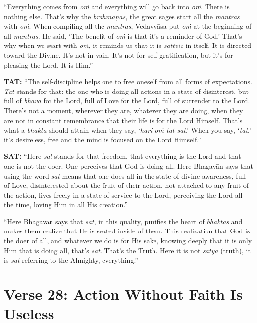 \enquote{Everything comes from \textit{oṁ} and everything will go back into \textit{oṁ}. There is nothing else. That’s why the \textit{brāhmaṇas}, the great sages start all the \textit{mantras} with \textit{oṁ}. When compiling all the \textit{mantras}, Vedavyāsa put \textit{oṁ} at the beginning of all \textit{mantras}. He said, \enquote{The benefit of \textit{oṁ} is that it’s a reminder of God.} That’s why when we start with \textit{oṁ}, it reminds us that it is \textit{sattvic} in itself. It is directed toward the Divine. It’s not in vain. It’s not for self-gratification, but it’s for pleasing the Lord. It is Him.}

\textbf{TAT:} \enquote{The self-discipline helps one to free oneself from all forms of expectations. \textit{Tat} stands for that: the one who is doing all actions in a state of disinterest, but full of \textit{bhāva} for the Lord, full of Love for the Lord, full of surrender to the Lord. There’s not a moment, wherever they are, whatever they are doing, when they are not in constant remembrance that their life is for the Lord Himself. That’s what a \textit{bhakta} should attain when they say, \enquote{\textit{hari oṁ tat sat}.} When you say, \enquote{\textit{tat},} it’s desireless, free and the mind is focused on the Lord Himself.}

\textbf{SAT:} \enquote{Here \textit{sat} stands for that freedom, that everything is the Lord and that one is not the doer. One perceives that God is doing all. Here Bhagavān says that using the word \textit{sat} means that one does all in the state of divine awareness, full of Love, disinterested about the fruit of their action, not attached to any fruit of the action, lives freely in a state of service to the Lord, perceiving the Lord all the time, loving Him in all His creation.}

\enquote{Here Bhagavān says that \textit{sat}, in this quality, purifies the heart of \textit{bhaktas} and makes them realize that He is seated inside of them. This realization that God is the doer of all, and whatever we do is for His sake, knowing deeply that it is only Him that is doing all, that’s \textit{sat}. That’s the Truth. Here it is not \textit{satya} (truth), it is \textit{sat} referring to the Almighty, everything.}
\section{Verse 28: Action Without Faith Is Useless}\label{sec-verse-28-action-without-faith-is-useless}

